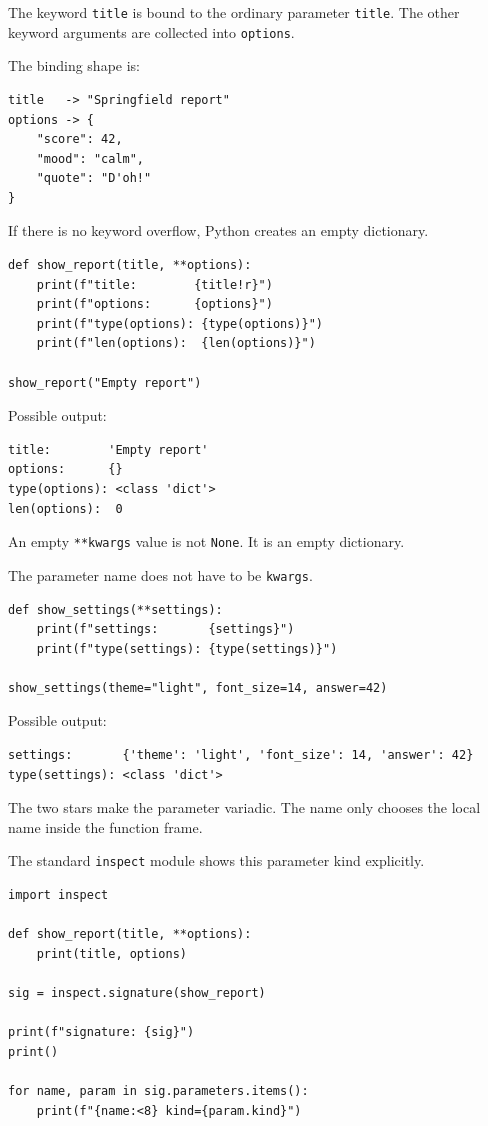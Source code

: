 The keyword \texttt{title} is bound to the ordinary parameter \texttt{title}. The other keyword arguments are collected into \texttt{options}.

The binding shape is:

\begin{verbatim}
title   -> "Springfield report"
options -> {
    "score": 42,
    "mood": "calm",
    "quote": "D'oh!"
}
\end{verbatim}

If there is no keyword overflow, Python creates an empty dictionary.

\begin{verbatim}
def show_report(title, **options):
    print(f"title:        {title!r}")
    print(f"options:      {options}")
    print(f"type(options): {type(options)}")
    print(f"len(options):  {len(options)}")

show_report("Empty report")
\end{verbatim}

Possible output:

\begin{verbatim}
title:        'Empty report'
options:      {}
type(options): <class 'dict'>
len(options):  0
\end{verbatim}

An empty \texttt{**kwargs} value is not \texttt{None}. It is an empty dictionary.

The parameter name does not have to be \texttt{kwargs}.

\begin{verbatim}
def show_settings(**settings):
    print(f"settings:       {settings}")
    print(f"type(settings): {type(settings)}")

show_settings(theme="light", font_size=14, answer=42)
\end{verbatim}

Possible output:

\begin{verbatim}
settings:       {'theme': 'light', 'font_size': 14, 'answer': 42}
type(settings): <class 'dict'>
\end{verbatim}

The two stars make the parameter variadic. The name only chooses the local name inside the function frame.

The standard \texttt{inspect} module shows this parameter kind explicitly.

\begin{verbatim}
import inspect

def show_report(title, **options):
    print(title, options)

sig = inspect.signature(show_report)

print(f"signature: {sig}")
print()

for name, param in sig.parameters.items():
    print(f"{name:<8} kind={param.kind}")
\end{verbatim}

